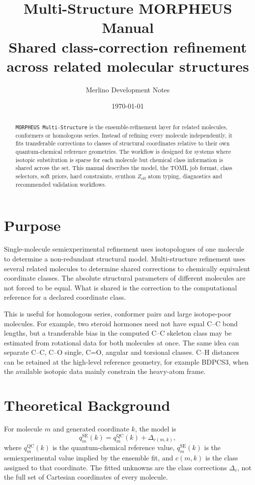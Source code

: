 \documentclass[11pt]{article}
\title{\textbf{Multi-Structure MORPHEUS Manual}\\
\large Shared class-correction refinement across related molecular structures}
\author{Merlino Development Notes}
\date{\today}
\newcommand{\program}{\texttt{MORPHEUS Multi-Structure}}
\newcommand{\zeff}{Z_\mathrm{eff}}
\begin{document}
\maketitle

\begin{abstract}
\program{} is the ensemble-refinement layer for related molecules, conformers
or homologous series.  Instead of refining every molecule independently, it
fits transferable corrections to classes of structural coordinates relative to
their own quantum-chemical reference geometries.  The workflow is designed for
systems where isotopic substitution is sparse for each molecule but chemical
class information is shared across the set.  This manual describes the model,
the TOML job format, class selectors, soft priors, hard constraints, synthon
\(\zeff\) atom typing, diagnostics and recommended validation workflows.
\end{abstract}

\tableofcontents
\newpage

\section{Purpose}

Single-molecule semiexperimental refinement uses isotopologues of one molecule
to determine a non-redundant structural model.  Multi-structure refinement uses
several related molecules to determine shared corrections to chemically
equivalent coordinate classes.  The absolute structural parameters of different
molecules are not forced to be equal.  What is shared is the correction to the
computational reference for a declared coordinate class.

This is useful for homologous series, conformer pairs and large isotope-poor
molecules.  For example, two steroid hormones need not have equal C--C bond
lengths, but a transferable bias in the computed C--C skeleton class may be
estimated from rotational data for both molecules at once.  The same idea can
separate C--C, C--O single, C=O, angular and torsional classes.  C--H
distances can be retained at the high-level reference geometry, for example
BDPCS3, when the available isotopic data mainly constrain the heavy-atom frame.

\section{Theoretical Background}

For molecule \(m\) and generated coordinate \(k\), the model is
\[
  q_m^\mathrm{SE}(k)
  =
  q_m^\mathrm{QC}(k)
  +
  \Delta_{c(m,k)} ,
\]
where \(q_m^\mathrm{QC}(k)\) is the quantum-chemical reference value,
\(q_m^\mathrm{SE}(k)\) is the semiexperimental value implied by the ensemble
fit, and \(c(m,k)\) is the class assigned to that coordinate.  The fitted
unknowns are the class corrections \(\Delta_c\), not the full set of Cartesian
coordinates of every molecule.
\end{document}
